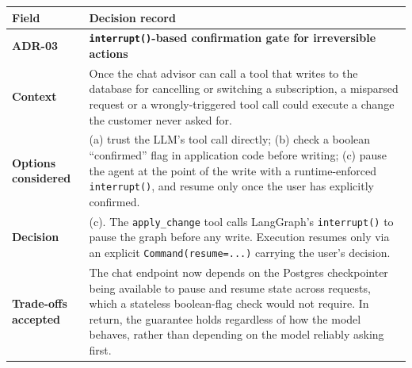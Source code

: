 \documentclass[
  11pt,
  a4paper,
  DIV=11,
  numbers=noendperiod,
  notitlepage]{scrreprt}
\newcounter{none} %
\begin{document}
{\def\LTcaptype{none} %
\begin{longtable}[]{@{}
  >{\raggedright\arraybackslash}p{}
  >{\raggedright\arraybackslash}p{}@{}}
\toprule\noalign{}
\begin{minipage}[b]{\linewidth}\raggedright
Field
\end{minipage} & \begin{minipage}[b]{\linewidth}\raggedright
Decision record
\end{minipage} \\
\midrule\noalign{}
\endhead
\bottomrule\noalign{}
\endlastfoot
\textbf{ADR-03} & \textbf{\texttt{interrupt()}-based confirmation gate
for irreversible actions} \\
\textbf{Context} & Once the chat advisor can call a tool that writes to
the database for cancelling or switching a subscription, a misparsed
request or a wrongly-triggered tool call could execute a change the
customer never asked for. \\
\textbf{Options considered} & (a) trust the LLM's tool call directly;
(b) check a boolean ``confirmed'' flag in application code before
writing; (c) pause the agent at the point of the write with a
runtime-enforced \texttt{interrupt()}, and resume only once the user has
explicitly confirmed. \\
\textbf{Decision} & (c). The \texttt{apply\_change} tool calls
LangGraph's \texttt{interrupt()} to pause the graph before any write.
Execution resumes only via an explicit \texttt{Command(resume=...)}
carrying the user's decision. \\
\textbf{Trade-offs accepted} & The chat endpoint now depends on the
Postgres checkpointer being available to pause and resume state across
requests, which a stateless boolean-flag check would not require. In
return, the guarantee holds regardless of how the model behaves, rather
than depending on the model reliably asking first. \\
\end{longtable}
}
\end{document}
